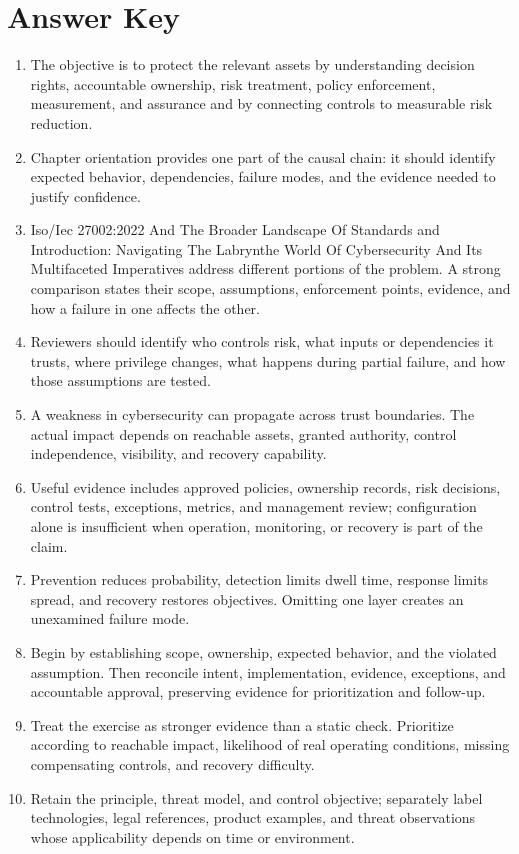 \documentclass[11pt]{article}
\begin{document}
\section*{Answer Key}
\begin{enumerate}
\item The objective is to protect the relevant assets by understanding decision rights, accountable ownership, risk treatment, policy enforcement, measurement, and assurance and by connecting controls to measurable risk reduction.
\item Chapter orientation provides one part of the causal chain: it should identify expected behavior, dependencies, failure modes, and the evidence needed to justify confidence.
\item Iso/Iec 27002:2022 And The Broader Landscape Of Standards and Introduction: Navigating The Labrynthe World Of Cybersecurity And Its Multifaceted Imperatives address different portions of the problem. A strong comparison states their scope, assumptions, enforcement points, evidence, and how a failure in one affects the other.
\item Reviewers should identify who controls risk, what inputs or dependencies it trusts, where privilege changes, what happens during partial failure, and how those assumptions are tested.
\item A weakness in cybersecurity can propagate across trust boundaries. The actual impact depends on reachable assets, granted authority, control independence, visibility, and recovery capability.
\item Useful evidence includes approved policies, ownership records, risk decisions, control tests, exceptions, metrics, and management review; configuration alone is insufficient when operation, monitoring, or recovery is part of the claim.
\item Prevention reduces probability, detection limits dwell time, response limits spread, and recovery restores objectives. Omitting one layer creates an unexamined failure mode.
\item Begin by establishing scope, ownership, expected behavior, and the violated assumption. Then reconcile intent, implementation, evidence, exceptions, and accountable approval, preserving evidence for prioritization and follow-up.
\item Treat the exercise as stronger evidence than a static check. Prioritize according to reachable impact, likelihood of real operating conditions, missing compensating controls, and recovery difficulty.
\item Retain the principle, threat model, and control objective; separately label technologies, legal references, product examples, and threat observations whose applicability depends on time or environment.
\end{enumerate}
\end{document}
